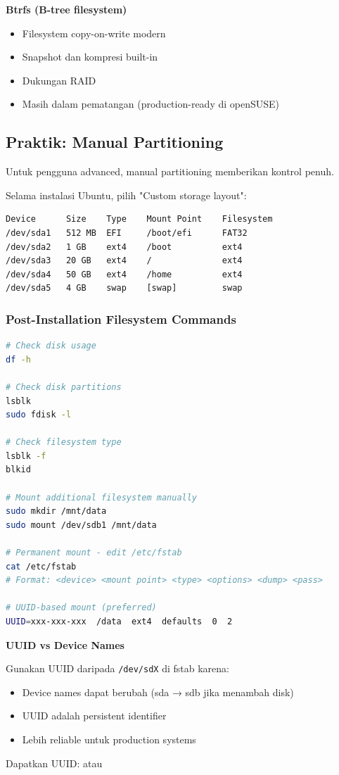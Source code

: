 \noindent
\textbf{Btrfs (B-tree filesystem)}
\begin{itemize}
    \item Filesystem copy-on-write modern
    \item Snapshot dan kompresi built-in
    \item Dukungan RAID
    \item Masih dalam pematangan (production-ready di openSUSE)
\end{itemize}

\subsection{Praktik: Manual Partitioning}

Untuk pengguna advanced, manual partitioning memberikan kontrol penuh.

Selama instalasi Ubuntu, pilih "Custom storage layout":

\begin{lstlisting}[caption={Example manual partition layout}]
Device      Size    Type    Mount Point    Filesystem
/dev/sda1   512 MB  EFI     /boot/efi      FAT32
/dev/sda2   1 GB    ext4    /boot          ext4
/dev/sda3   20 GB   ext4    /              ext4
/dev/sda4   50 GB   ext4    /home          ext4
/dev/sda5   4 GB    swap    [swap]         swap
\end{lstlisting}

\subsubsection{Post-Installation Filesystem Commands}

\begin{lstlisting}[language=bash, caption={Filesystem verification dan management}]
# Check disk usage
df -h

# Check disk partitions
lsblk
sudo fdisk -l

# Check filesystem type
lsblk -f
blkid

# Mount additional filesystem manually
sudo mkdir /mnt/data
sudo mount /dev/sdb1 /mnt/data

# Permanent mount - edit /etc/fstab
cat /etc/fstab
# Format: <device> <mount point> <type> <options> <dump> <pass>

# UUID-based mount (preferred)
UUID=xxx-xxx-xxx  /data  ext4  defaults  0  2
\end{lstlisting}

\begin{notebox}
\textbf{UUID vs Device Names}

Gunakan UUID daripada \texttt{/dev/sdX} di fstab karena:
\begin{itemize}
    \item Device names dapat berubah (sda → sdb jika menambah disk)
    \item UUID adalah persistent identifier
    \item Lebih reliable untuk production systems
\end{itemize}

Dapatkan UUID:  atau 
\end{notebox}

